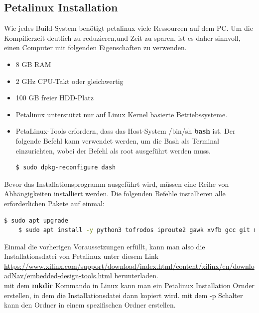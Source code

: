 \subsection{Petalinux Installation}
Wie jedes Build-System benötigt petalinux viele Ressourcen auf dem PC. Um die Kompilierzeit deutlich zu reduzieren,und Zeit zu sparen, ist es daher sinnvoll, einen Computer mit folgenden Eigenschaften zu verwenden.\cite{Xilinx2020}

\begin{itemize}
	\item 8 GB RAM
	\item 2 GHz CPU-Takt oder gleichwertig
	\item 100 GB freier HDD-Platz
	\item Petalinux unterstützt nur auf Linux Kernel basierte Betriebssysteme. 
	\item PetaLinux-Tools erfordern, dass das Host-System /bin/sh \textbf{bash} ist. Der folgende Befehl kann verwendet werden, um die Bash als Terminal einzurichten, wobei der Befehl als root ausgeführt werden muss. 
	\begin{lstlisting}[language=bash]
		$ sudo dpkg-reconfigure dash
	\end{lstlisting}
\end{itemize}
Bevor das Installationsprogramm ausgeführt wird, müssen eine Reihe von Abhängigkeiten installiert werden. Die folgenden Befehle installieren alle erforderlichen Pakete auf einmal:

\begin{lstlisting}[language=bash]
	$ sudo apt upgrade
	$ sudo apt install -y python3 tofrodos iproute2 gawk xvfb gcc git make net-tools libncurses5-dev tftpd zlib1g-dev ibssl-dev flex bison libselinux1 gnupg wget diffstat chrpath socat xterm autoconf libtool tar unzip texinfo zlib1g-dev gcc-multilib build-essential libsdl1.2-dev libglib2.0-dev screen pax gzip
\end{lstlisting}

 Einmal die vorherigen Voraussetzungen erfüllt, kann man also die Installationsdatei von Petalinux unter diesem Link \url{https://www.xilinx.com/support/download/index.html/content/xilinx/en/downloadNav/embedded-design-tools.html} herunterladen.\\ 
 mit dem \textbf{mkdir} Kommando in Linux kann man ein Petalinux Installation Ornder erstellen, in dem die Installationsdatei dann kopiert wird. mit dem -p Schalter kann den Ordner in einem spezifischen Ordner erstellen.\\
 
